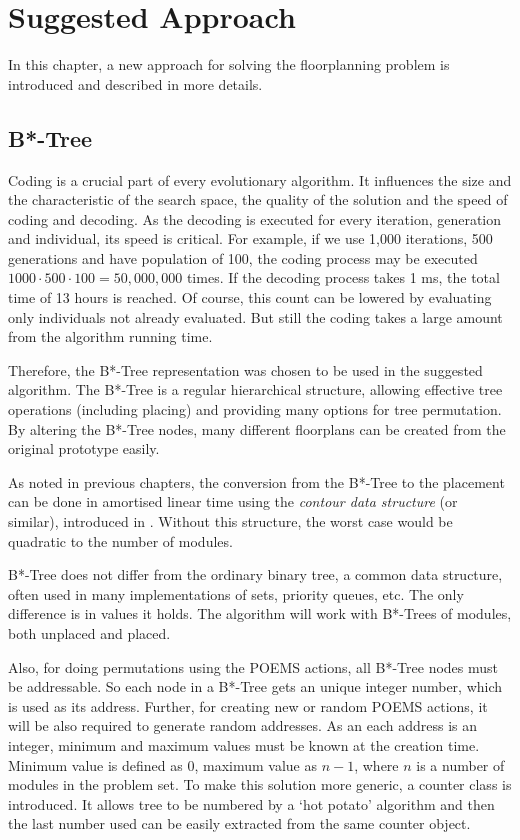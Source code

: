 \chapter{Suggested Approach}
\label{sec:approach}

In this chapter, a new approach for solving the floorplanning problem is introduced and described in more details.

\section{B*-Tree}

Coding is a crucial part of every evolutionary algorithm. It influences the size and the characteristic of the search space, the quality of the solution and the speed of coding and decoding. As the decoding is executed for every iteration, generation and individual, its speed is critical. For example, if we use 1,000 iterations, 500 generations and have population of 100, the coding process may be executed $ 1000 \cdot 500 \cdot 100 = 50,000,000 $ times. If the decoding process takes 1 ms, the total time of 13 hours is reached. Of course, this count can be lowered by evaluating only individuals not already evaluated. But still the coding takes a large amount from the algorithm running time.

Therefore, the B*-Tree representation \cite{btree} was chosen to be used in the suggested algorithm. The B*-Tree is a regular hierarchical structure, allowing effective tree operations (including placing) and providing many options for tree permutation. By altering the B*-Tree nodes, many different floorplans can be created from the original prototype easily. 

As noted in previous chapters, the conversion from the B*-Tree to the placement can be done in amortised linear time using the {\em contour data structure} (or similar), introduced in \cite{otree}. Without this structure, the worst case would be quadratic to the number of modules.

B*-Tree does not differ from the ordinary binary tree, a common data structure, often used in many implementations of sets, priority queues, etc. The only difference is in values it holds. The algorithm will work with B*-Trees of modules, both unplaced and placed.

Also, for doing permutations using the POEMS actions, all B*-Tree nodes must be addressable. So each node in a B*-Tree gets an unique integer number, which is used as its address. Further, for creating new or random POEMS actions, it will be also required to generate random addresses. As an each address is an integer, minimum and maximum values must be known at the creation time. Minimum value is defined as $0$, maximum value as $n-1$, where $n$ is a number of modules in the problem set. To make this solution more generic, a counter class is introduced. It allows tree to be numbered by a `hot potato' algorithm and then the last number used can be easily extracted from the same counter object.

